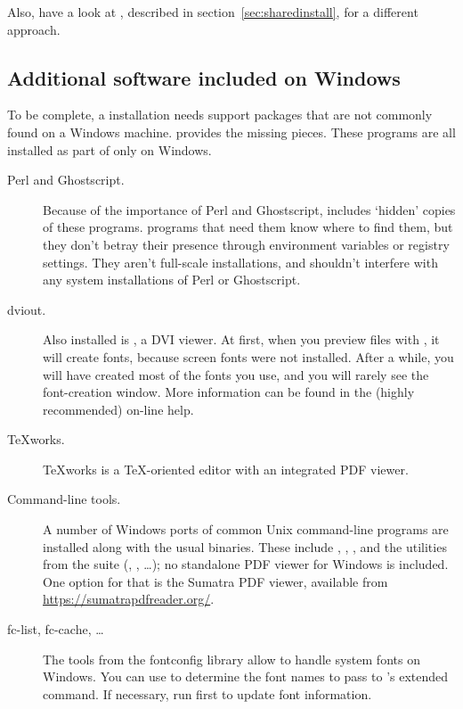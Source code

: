 \documentclass{article}
\begin{document}
Also, have a look at , described in
section~\ref{sec:sharedinstall}, for a different approach.

\subsection{Additional software included on Windows}

To be complete, a \TL{} installation needs support packages that are not
commonly found on a Windows machine. \TL{} provides the missing pieces.
These programs are all installed as part of \TL{} only on Windows.

\begin{description}
\item[Perl and Ghostscript.] Because of the importance of Perl and
  Ghostscript, \TL{} includes `hidden' copies of these
  programs. \TL{} programs that need them know where to find them,
  but they don't betray their presence through environment variables
  or registry settings. They aren't full-scale installations, and
  shouldn't interfere with any system installations of Perl or
  Ghostscript.

\item[dviout.] Also installed is , a DVI viewer.
  At first, when you preview files with , it will create
  fonts, because screen fonts were not installed. After a while, you
  will have created most of the fonts you use, and you will rarely see
  the font-creation window.  More information can be found in the
  (highly recommended) on-line help.

\item[\TeX{}works.]  \TeX{}works is a \TeX-oriented editor with
  an integrated PDF viewer.

\item[Command-line tools.] A number of Windows ports of common Unix
  command-line programs are installed along with the usual \TL{}
  binaries. These include , ,
  , and the utilities from the  suite
  (, , \ldots); no standalone PDF
  viewer for Windows is included.  One option for that is the Sumatra
  PDF viewer, available from \url{https://sumatrapdfreader.org/}.

\item[fc-list, fc-cache, \ldots] The tools from the fontconfig library allow
  \XeTeX{} to handle system fonts on Windows.  You can use
   to determine the font names to pass to \XeTeX's
  extended  command. If necessary, run 
  first to update font information.

\end{description}
\end{document}
